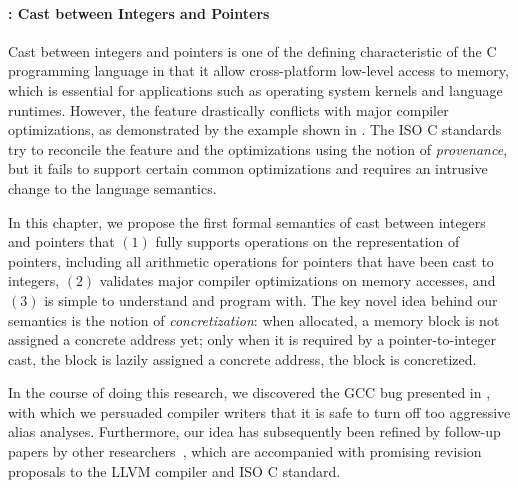 
\paragraph{: Cast between Integers and Pointers}

Cast between integers and pointers is one of the defining characteristic of the C programming
language in that it allow cross-platform low-level access to memory, which is essential for
applications such as operating system kernels and language runtimes.  However, the feature
drastically conflicts with major compiler optimizations, as demonstrated by the example shown in
.  The ISO C standards try to reconcile the feature and the optimizations
using the notion of \emph{provenance}, but it fails to support certain common optimizations and
requires an intrusive change to the language semantics.

In this chapter, we propose the first formal semantics of cast between integers and pointers that
$(1)$ fully supports operations on the representation of pointers, including all arithmetic
operations for pointers that have been cast to integers, $(2)$ validates major compiler
optimizations on memory accesses, and $(3)$ is simple to understand and program with.  The key novel
idea behind our semantics is the notion of \emph{concretization}: when allocated, a memory block is
not assigned a concrete address yet; only when it is required by a pointer-to-integer cast, the
block is lazily assigned a concrete address, \ie{} the block is concretized.

In the course of doing this research, we discovered the GCC bug presented in
, with which we persuaded compiler writers that it is safe to turn off
too aggressive alias analyses.  Furthermore, our idea has subsequently been refined by follow-up
papers by other researchers~\cite{intptrcast-oopsla,intptrcast-popl}, which are accompanied with
promising revision proposals to the LLVM compiler and ISO C standard.



